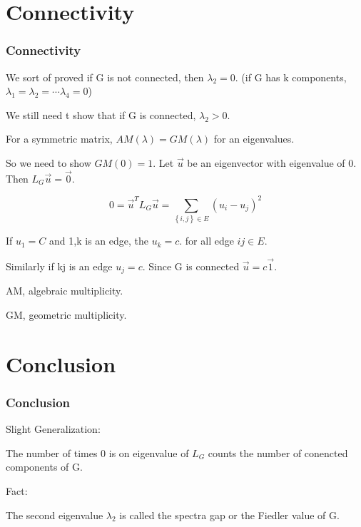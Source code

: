 \documentclass{beamer}
\begin{document}
\section{Connectivity}
\begin{frame}
\frametitle{\textbf{Connectivity} }
We sort of proved if G is not connected, then $\lambda_2 = 0$. (if G has k components, $\lambda_1 = \lambda_2 = \cdots \lambda_4 = 0$) \vspace{0.2 cm}

We still need t show that if G is connected, $\lambda_2 > 0$.

For a symmetric matrix, $AM(\lambda) = GM(\lambda)$ for an eigenvalues.

So we need to show $GM(0)=1$. Let $\vec{u}$ be an eigenvector with eigenvalue of 0. Then $L_{G}\vec{u}=\vec{0}$.

\begin{equation*}
    0 = \vec{u}^{T}L_{G}\vec{u} = \sum_{\left\{i,j\right\} \in E}\left(u_{i}-u_{j}\right)^2
\end{equation*}

If $u_1 = C$ and {1,k} is an edge, the $u_k = c$. for all edge $ij \in E$.

Similarly if kj is an edge $u_j=c$. Since G is connected $\vec{u} = c \vec{1}$. 

AM, algebraic multiplicity. \vspace{0.2 cm}

GM, geometric multiplicity. \vspace{0.2 cm}

\end{frame}



\section{Conclusion}
\begin{frame}
\frametitle{Conclusion}

Slight Generalization: \vspace{0.2 cm}

The number of times 0 is on eigenvalue of $L_{G}$ counts the number of conencted components of G.

Fact: \vspace{0.2 cm}

The second eigenvalue $\lambda_2$ is called the spectra gap or the Fiedler value of G.

\end{frame}
\end{document}
